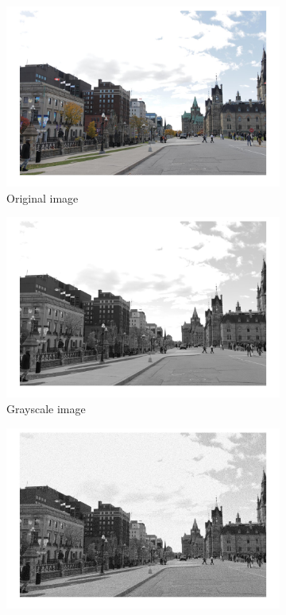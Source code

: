 \documentclass[conference]{IEEEtran}
\begin{document}
\begin{figure}[h!]
\centering
\begin{subfigure}[b]{0.4\linewidth}
\includegraphics[width=\linewidth]{images/img13.jpg}
\caption{Original image}
\end{subfigure}
\begin{subfigure}[b]{0.4\linewidth}
\includegraphics[width=\linewidth]{images/img14.jpg}
\caption{Grayscale image}
\end{subfigure}
\begin{subfigure}[b]{0.4\linewidth}
\includegraphics[width=\linewidth]{images/img15.jpg}

\end{subfigure}
\end{figure}
\end{document}
